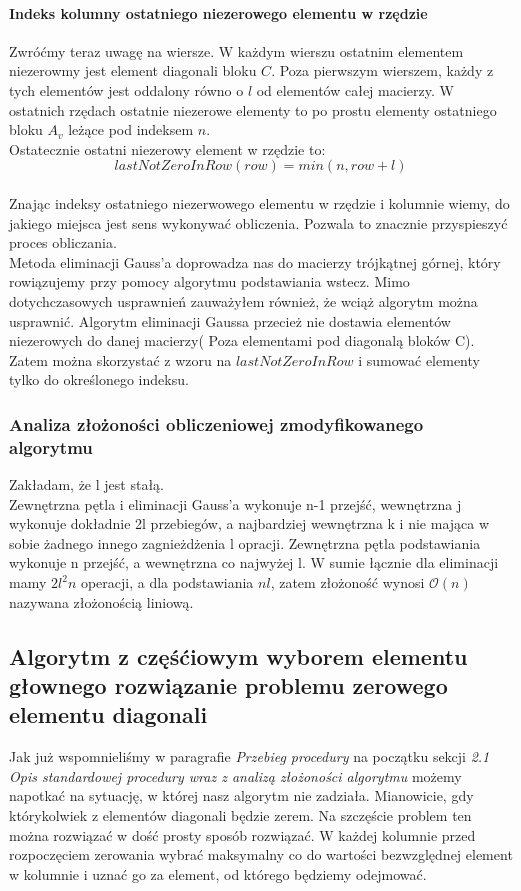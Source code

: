 \documentclass[11pt]{article}
\begin{document}
\begin{flushleft}
\paragraph{Indeks kolumny ostatniego niezerowego elementu w rzędzie} 
Zwróćmy teraz uwagę na wiersze. W każdym wierszu ostatnim elementem niezerowmy jest element diagonali bloku $C$. Poza pierwszym wierszem, każdy z tych elementów jest oddalony równo o $l$ od elementów całej macierzy. W ostatnich rzędach ostatnie niezerowe elementy to po prostu elementy ostatniego bloku $A_v$ leżące pod indeksem $n$. \\Ostatecznie ostatni niezerowy element w rzędzie to:
$$lastNotZeroInRow(row) = min(n, row+l)$$ \\
Znając indeksy ostatniego niezerwowego elementu w rzędzie i kolumnie wiemy, do jakiego miejsca jest sens wykonywać obliczenia. Pozwala to znacznie przyspieszyć proces obliczania.\\
Metoda eliminacji Gauss'a doprowadza nas do macierzy trójkątnej górnej, który rowiązujemy przy pomocy algorytmu podstawiania wstecz. Mimo dotychczasowych usprawnień zauważyłem również, że wciąż algorytm można usprawnić. Algorytm eliminacji Gaussa przecież nie dostawia elementów niezerowych do danej macierzy( Poza elementami pod diagonalą bloków C). Zatem można skorzystać z wzoru na  $lastNotZeroInRow$ i sumować elementy tylko do określonego indeksu.
\subsubsection{Analiza złożoności obliczeniowej zmodyfikowanego algorytmu}
Zakładam, że l jest stałą. \\
Zewnętrzna pętla i eliminacji Gauss'a  wykonuje n-1 przejść, wewnętrzna j wykonuje dokładnie 2l przebiegów, a najbardziej wewnętrzna k i nie mająca w sobie żadnego innego zagnieżdżenia l opracji. Zewnętrzna pętla podstawiania wykonuje n przejść, a wewnętrzna co najwyżej l. W sumie łącznie dla eliminacji mamy $2l^2n$ operacji, a dla podstawiania $nl$, zatem złożoność wynosi $\mathcal{O}(n)$ nazywana złożonością liniową.
\subsection{Algorytm z częśćiowym wyborem elementu głownego rozwiązanie problemu zerowego elementu diagonali}
Jak już wspomnieliśmy w paragrafie \textsl{Przebieg procedury} na początku sekcji \textsl{2.1 Opis standardowej procedury wraz z analizą złożoności algorytmu} możemy napotkać na sytuację, w której nasz algorytm nie zadziała. Mianowicie, gdy którykolwiek z elementów diagonali będzie zerem. Na szczęście problem ten można rozwiązać w dość prosty sposób rozwiązać. W każdej kolumnie przed rozpoczęciem zerowania wybrać maksymalny co do wartości bezwzględnej element w kolumnie i uznać go za element, od którego będziemy odejmować.

\end{flushleft}
\end{document}
